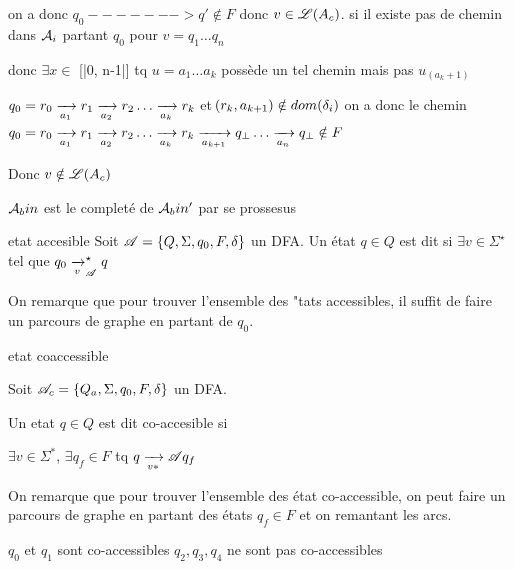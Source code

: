 \begin{nproof}
\begin{enumerate}
            on a donc $q_0 -------> q' \notin F $ donc $v \in \mathscr{L}(A_c)$.
            \itt si il existe pas de chemin dans $\mathcal{A}_i$ partant $q_0$ pour $v=q_1 \dots q_n$
        
        donc $\exists x \in $ [|0, n-1|] tq $u=a_1 \dots a_k$ possède un tel chemin mais pas $u_(a_k+1)$
        \end{enumerate}
        
        $q_0 = r_0 \lima{a_1} r_1 \lima{a_2} r_2 \dots \lima{a_k} r_k$ et $\!\left(r_k, a_{k+1}\right) \notin dom \!\left(\delta_i\right)$
        on a donc le chemin
        $q_0 = r_0 \lima{a_1} r_1 \lima{a_2} r_2 \dots \lima{a_k} r_k \lima{a_{k+1}} q_\bot \dots \lima{a_n} q_\bot \notin F$
            
        
        Donc $v \notin \mathscr{L}(A_c)$
    \end{nproof}
    
    
    
    \begin{example}{}{}
        $\mathcal{A}_bin$ est le completé de $\mathcal{A}_bin'$
        par se prossesus 
        
    \end{example}
    
    \begin{definition}{etat accesible}{}
        Soit $\mathscr{A} = \left\{Q, \Sigma, q_0, F, \delta\right\}$ un DFA.
        Un état $q \in Q$ est dit  si $\exists v \in \Sigma^\star$ tel que $q_0 \lima{v}_\bsA^\star q$
    \end{definition}
    
    On remarque que pour trouver l'ensemble des "tats accessibles, il suffit de faire un parcours de graphe en partant de $q_0$.
    
    \begin{definition}{etat coaccessible}{}
        
        Soit $\mathscr{A}_c = \left\{Q_a, \Sigma, q_0, F, \delta\right\}$ un DFA.
        
        Un etat $q\in Q$ est dit co-accesible si 
        
        $\exists v \in \Sigma^*$, $\exists q_f \in F $ tq $ q \lima{v *}{\bsA} q_f$
        
    \end{definition}
    
    On remarque que pour trouver l'ensemble des état co-accessible, on peut faire un parcours de graphe en partant des états $q_f \in F $ et on remantant les arcs.
    
    \begin{example}{}{}
        \begin{enumerate}
            \itt $q_0$ et $q_1$ sont co-accessibles
            \itt $q_2, q_3, q_4$ ne sont pas co-accessibles
        \end{enumerate}
    \end{example}
    
